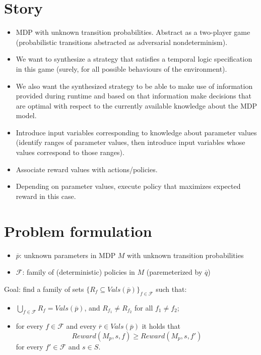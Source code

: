 \section*{Story}

\begin{itemize}
    \item MDP with unknown transition probabilities. Abstract as a two-player game (probabilistic transitions abstracted as adversarial nondeterminism).
    \item We want to synthesize a strategy that satisfies a temporal logic specification in this game (surely, for all possible behaviours of the environment). 
    \item We also want the synthesized strategy to be able to make use of information provided during runtime and based on that information make decisions that are optimal with respect to the currently available knowledge about the MDP model.
    \item Introduce input variables corresponding to knowledge about parameter values (identify ranges of parameter values, then introduce input variables whose values correspond to those ranges).
    \item Associate reward values with actions/policies.
    \item Depending on parameter values, execute policy that maximizes expected reward in this case. 
\end{itemize}
\section{Problem formulation}
\begin{itemize}
    \item $\overline p$: unknown parameters in MDP $M$ with unknown transition probabilities
    \item $\mathcal F$: family of (deterministic) policies in $M$ (paremeterized by $\overline q$)
\end{itemize}

\bigskip

Goal: find a family of sets $\{R_f \subseteq Vals(\overline p)\}_{f \in \mathcal F}$ such that:
\begin{itemize}
    \item $\bigcup_{f \in \mathcal F} R_f = Vals(\overline p)$, and $R_{f_1} \neq R_{f_2}$ for all $f_1 \neq f_2$;
    \item for every $f \in \mathcal{F}$ and every $\overline r \in Vals(\overline p)$ it holds that 
    \[Reward(M_p,s,f) \geq Reward(M_p,s,f')\]
    for every $f' \in \mathcal{F}$ and $s \in S$. 
\end{itemize}

